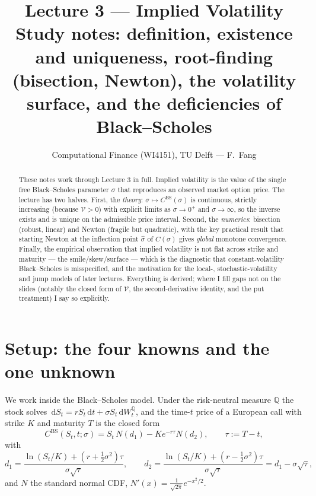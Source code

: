 \documentclass[11pt]{article}
\title{\textbf{Lecture 3 --- Implied Volatility}\\[2pt]
\large Study notes: definition, existence and uniqueness, root-finding (bisection, Newton),
the volatility surface, and the deficiencies of Black--Scholes}
\author{Computational Finance (WI4151), TU Delft --- F.\ Fang}
\date{}
\newcommand{\dd}{\,\mathrm{d}}
\newcommand{\BS}{\mathrm{BS}}
\newcommand{\Vega}{\mathcal{V}}
\begin{document}
\maketitle
\vspace{-1.2em}

\begin{abstract}
\noindent These notes work through Lecture 3 in full. Implied volatility is the value of the
single free Black--Scholes parameter $\sigma$ that reproduces an observed market option price.
The lecture has two halves. First, the \emph{theory}: $\sigma\mapsto C^{\BS}(\sigma)$ is
continuous, strictly increasing (because $\Vega>0$) with explicit limits as $\sigma\to0^+$ and
$\sigma\to\infty$, so the inverse exists and is unique on the admissible price interval. Second,
the \emph{numerics}: bisection (robust, linear) and Newton (fragile but quadratic), with the
key practical result that starting Newton at the inflection point $\hat\sigma$ of $C(\sigma)$
gives \emph{global} monotone convergence. Finally, the empirical observation that implied
volatility is not flat across strike and maturity --- the smile/skew/surface --- which is the
diagnostic that constant-volatility Black--Scholes is misspecified, and the motivation for the
local-, stochastic-volatility and jump models of later lectures. Everything is derived; where I
fill gaps not on the slides (notably the closed form of $\Vega$, the second-derivative identity,
and the put treatment) I say so explicitly.
\end{abstract}

\tableofcontents

\section{Setup: the four knowns and the one unknown}

We work inside the Black--Scholes model. Under the risk-neutral measure $\mathbb{Q}$ the stock
solves $\dd S_t=rS_t\dd t+\sigma S_t\dd W_t^{\mathbb{Q}}$, and the time-$t$ price of a European
call with strike $K$ and maturity $T$ is the closed form
\begin{equation}\label{eq:bs}
C^{\BS}(S_t,t;\sigma)=S_t\,N(d_1)-Ke^{-r\tau}N(d_2),\qquad \tau:=T-t,
\end{equation}
with
\begin{equation}\label{eq:d1d2}
d_1=\frac{\ln(S_t/K)+(r+\tfrac12\sigma^2)\tau}{\sigma\sqrt{\tau}},\qquad
d_2=\frac{\ln(S_t/K)+(r-\tfrac12\sigma^2)\tau}{\sigma\sqrt{\tau}}=d_1-\sigma\sqrt{\tau},
\end{equation}
and $N$ the standard normal CDF, $N'(x)=\tfrac{1}{\sqrt{2\pi}}e^{-x^2/2}$.
\end{document}
